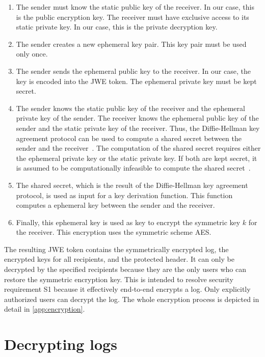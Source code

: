 \documentclass[../main.tex]{subfiles}
\begin{document}
\begin{itemize}
\begin{enumerate}
    \item 
    The sender must know the static public key of the receiver. 
    In our case, this is the public encryption key.
    The receiver must have exclusive access to its static private key.
    In our case, this is the private decryption key.
    \item 
    The sender creates a new ephemeral key pair. 
    This key pair must be used only once.
    \item 
    The sender sends the ephemeral public key to the receiver.
    In our case, the key is encoded into the JWE token.
    The ephemeral private key must be kept secret.
    \item 
    The sender knows the static public key of the receiver and the ephemeral private key of the sender.
    The receiver knows the ephemeral public key of the sender and the static private key of the receiver.
    Thus, the Diffie-Hellman key agreement protocol can be used to compute a shared secret between the sender and the receiver~\cite[438]{Eckert2018}.
    The computation of the shared secret requires either the ephemeral private key or the static private key.
    If both are kept secret, it is assumed to be computationally infeasible to compute the shared secret~\cite[438]{Eckert2018}.
    \item 
    The shared secret, which is the result of the Diffie-Hellman key agreement protocol, is used as input for a key derivation function.
    This function computes a ephemeral key between the sender and the receiver.
    \item 
    Finally, this ephemeral key is used as key to encrypt the symmetric key $k$ for the receiver.
    This encryption uses the symmetric scheme AES.
\end{enumerate}


The resulting JWE token contains the symmetrically encrypted log, the encrypted keys for all recipients, and the protected header.
It can only be decrypted by the specified recipients because they are the only users who can restore the symmetric encryption key.
This is intended to resolve security requirement S1 because it effectively end-to-end encrypts a log.
Only explicitly authorized users can decrypt the log.
The whole encryption process is depicted in detail in \cref{app:encryption}.

\section{Decrypting logs}\label{sec:decrypting}


\end{itemize}
\end{document}
